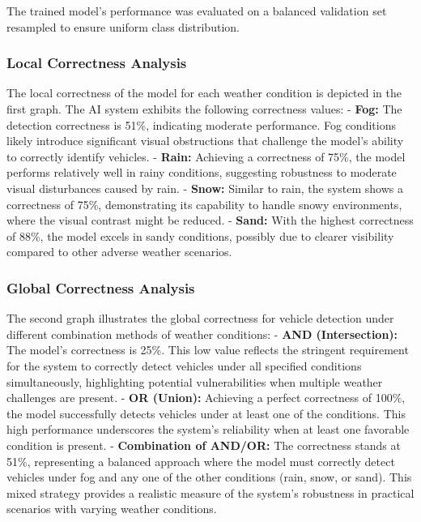 The trained model's performance was evaluated on a balanced validation set resampled to ensure uniform class distribution.

\subsubsection{Local Correctness Analysis}

The local correctness of the model for each weather condition is depicted in the first graph. The AI system exhibits the following correctness values:
- \textbf{Fog:} The detection correctness is 51\%, indicating moderate performance. Fog conditions likely introduce significant visual obstructions that challenge the model's ability to correctly identify vehicles.
- \textbf{Rain:} Achieving a correctness of 75\%, the model performs relatively well in rainy conditions, suggesting robustness to moderate visual disturbances caused by rain.
- \textbf{Snow:} Similar to rain, the system shows a correctness of 75\%, demonstrating its capability to handle snowy environments, where the visual contrast might be reduced.
- \textbf{Sand:} With the highest correctness of 88\%, the model excels in sandy conditions, possibly due to clearer visibility compared to other adverse weather scenarios.

\subsubsection{Global Correctness Analysis}

The second graph illustrates the global correctness for vehicle detection under different combination methods of weather conditions:
- \textbf{AND (Intersection):} The model's correctness is 25\%. This low value reflects the stringent requirement for the system to correctly detect vehicles under all specified conditions simultaneously, highlighting potential vulnerabilities when multiple weather challenges are present.
- \textbf{OR (Union):} Achieving a perfect correctness of 100\%, the model successfully detects vehicles under at least one of the conditions. This high performance underscores the system's reliability when at least one favorable condition is present.
- \textbf{Combination of AND/OR:} The correctness stands at 51\%, representing a balanced approach where the model must correctly detect vehicles under fog and any one of the other conditions (rain, snow, or sand). This mixed strategy provides a realistic measure of the system's robustness in practical scenarios with varying weather conditions.

